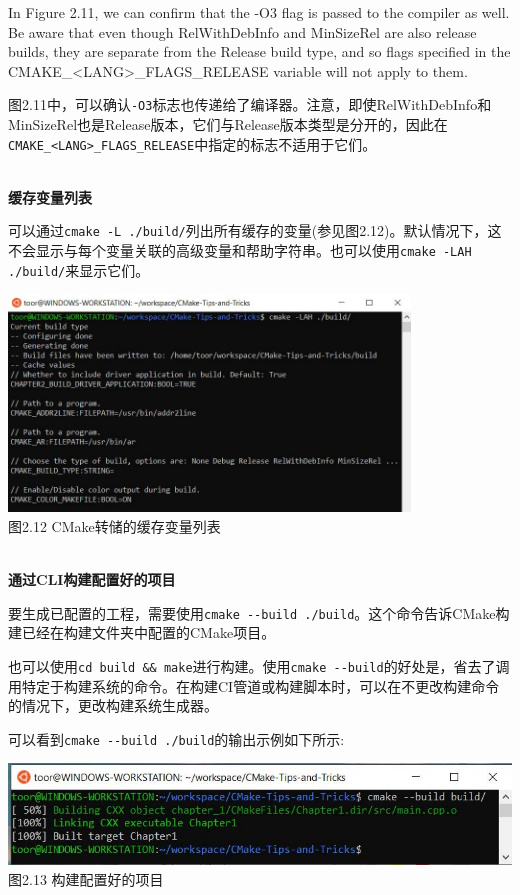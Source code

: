 In Figure 2.11, we can confirm that the -O3 flag is passed to the compiler as well. Be aware that even though RelWithDebInfo and MinSizeRel are also release builds, they are separate from the Release build type, and so flags specified in the CMAKE\_<LANG>\_FLAGS\_RELEASE variable will not apply to them.

图2.11中，可以确认\texttt{-O3}标志也传递给了编译器。注意，即使RelWithDebInfo和MinSizeRel也是Release版本，它们与Release版本类型是分开的，因此在\texttt{CMAKE\_<LANG>\_FLAGS\_RELEASE}中指定的标志不适用于它们。

\hspace*{\fill} \\ %
\noindent
\textbf{缓存变量列表}

可以通过\texttt{cmake -L ./build/}列出所有缓存的变量(参见图2.12)。默认情况下，这不会显示与每个变量关联的高级变量和帮助字符串。也可以使用\texttt{cmake -LAH ./build/}来显示它们。

\begin{center}
\includegraphics[width=0.8\textwidth]{content/1/chapter2/images/12.jpg}\\
图2.12 CMake转储的缓存变量列表
\end{center}

\hspace*{\fill} \\ %
\noindent
\textbf{通过CLI构建配置好的项目}

要生成已配置的工程，需要使用\texttt{cmake -{}-build ./build}。这个命令告诉CMake构建已经在构建文件夹中配置的CMake项目。

也可以使用\texttt{cd build \&\& make}进行构建。使用\texttt{cmake -{}-build}的好处是，省去了调用特定于构建系统的命令。在构建CI管道或构建脚本时，可以在不更改构建命令的情况下，更改构建系统生成器。

可以看到\texttt{cmake -{}-build ./build}的输出示例如下所示:

\begin{center}
\includegraphics[width=1.\textwidth]{content/1/chapter2/images/13.jpg}\\
图2.13 构建配置好的项目
\end{center}

